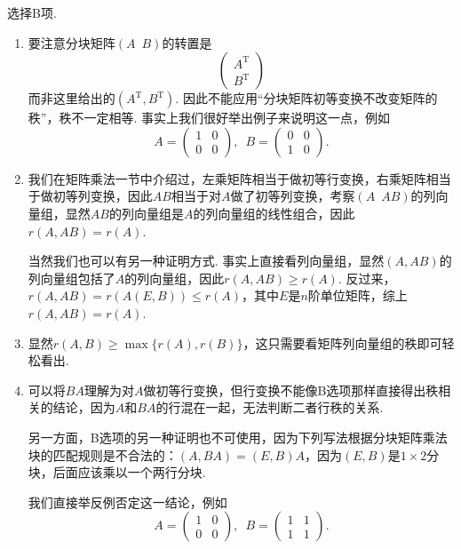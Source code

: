 \documentclass[12pt,fontset=fandol]{ctexart}
\begin{document}
\begin{solve}
选择B项.
    \begin{enumerate}[label=\Alph*.]
        \item 要注意分块矩阵$(A\enspace B)$的转置是
              \[\begin{pmatrix}
                      A^\mathrm{T} \\ B^\mathrm{T}
                  \end{pmatrix}\]
              而非这里给出的$(A^\mathrm{T}, B^\mathrm{T})$. 因此不能应用``分块矩阵初等变换不改变矩阵的秩''，秩不一定相等. 事实上我们很好举出例子来说明这一点，例如
              \[A=\begin{pmatrix}
                      1 & 0 \\ 0 & 0
                  \end{pmatrix},\enspace B=\begin{pmatrix}
                      0 & 0 \\ 1 & 0
                  \end{pmatrix}.\]

        \item 我们在矩阵乘法一节中介绍过，左乘矩阵相当于做初等行变换，右乘矩阵相当于做初等列变换，因此$AB$相当于对$A$做了初等列变换，考察$(A\enspace AB)$的列向量组，显然$AB$的列向量组是$A$的列向量组的线性组合，因此$r(A,AB)=r(A)$.

              当然我们也可以有另一种证明方式. 事实上直接看列向量组，显然$(A,AB)$的列向量组包括了$A$的列向量组，因此$r(A,AB)\geqslant r(A)$. 反过来，$r(A,AB)=r(A(E,B))\leqslant r(A)$，其中$E$是$n$阶单位矩阵，综上$r(A,AB)=r(A)$.

        \item 显然$r(A,B)\geqslant \max\{r(A), r(B)\}$，这只需要看矩阵列向量组的秩即可轻松看出.

        \item 可以将$BA$理解为对$A$做初等行变换，但行变换不能像B选项那样直接得出秩相关的结论，因为$A$和$BA$的行混在一起，无法判断二者行秩的关系.

              另一方面，B选项的另一种证明也不可使用，因为下列写法根据分块矩阵乘法块的匹配规则是不合法的：$(A,BA)=(E,B)A$，因为$(E,B)$是$1\times 2$分块，后面应该乘以一个两行分块.

              我们直接举反例否定这一结论，例如
              \[A=\begin{pmatrix}
                      1 & 0 \\ 0 & 0
                  \end{pmatrix},\enspace B=\begin{pmatrix}
                      1 & 1 \\ 1 & 1
                  \end{pmatrix}.\]
    \end{enumerate}
\end{solve}
\end{document}

